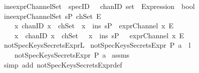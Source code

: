 \begin{isabellebody}
{}
\isanewline
%
\isanewline
%
\isanewline
{}\isamarkupfalse%
\isanewline
\ ine{\isacharunderscore}exprChannelSet\ {\isacharcolon}{\isacharcolon}\ {\isachardoublequoteopen}specID\ \ {\isasymRightarrow}\ chanID\ set\ {\isasymRightarrow}\ Expression\ {\isasymRightarrow}\ bool{\isachardoublequoteclose}\isanewline
{}\isanewline
\ {\isachardoublequoteopen}ine{\isacharunderscore}exprChannelSet\ sP\ chSet\ E\ {\isasymequiv}\ \isanewline
\ \ \ {\isacharparenleft}{\isacharparenleft}{\isasymforall}\ {\isacharparenleft}x\ {\isacharcolon}{\isacharcolon}chanID{\isacharparenright}{\isachardot}\ {\isacharparenleft}{\isacharparenleft}x\ {\isasymin}\ chSet{\isacharparenright}\ {\isasymlongrightarrow}\ {\isacharparenleft}{\isacharparenleft}x\ {\isasymin}\ {\isacharparenleft}ins\ sP{\isacharparenright}{\isacharparenright}\ {\isasymand}\ {\isacharparenleft}exprChannel\ x\ E{\isacharparenright}{\isacharparenright}{\isacharparenright}{\isacharparenright}\isanewline
\ \ \ {\isasymand}\isanewline
\ \ \ {\isacharparenleft}{\isasymforall}\ {\isacharparenleft}x\ {\isacharcolon}{\isacharcolon}\ chanID{\isacharparenright}{\isachardot}\ {\isacharparenleft}{\isacharparenleft}x\ {\isasymnotin}\ chSet{\isacharparenright}\ {\isasymand}\ {\isacharparenleft}\ x\ {\isasymin}\ {\isacharparenleft}ins\ sP{\isacharparenright}{\isacharparenright}\ {\isasymlongrightarrow}\ {\isasymnot}\ exprChannel\ x\ E{\isacharparenright}{\isacharparenright}{\isacharparenright}{\isachardoublequoteclose}\isanewline
\isanewline
%
\isanewline
%
\ \isanewline
%
\isanewline
{}\isamarkupfalse%
\ notSpecKeysSecretsExpr{\isacharunderscore}L{}{\isacharcolon}\isanewline
{}\ {\isachardoublequoteopen}notSpecKeysSecretsExpr\ P\ {\isacharparenleft}a\ {\isacharhash}\ l{\isacharparenright}{\isachardoublequoteclose}\isanewline
{}\ \ \ \ {\isachardoublequoteopen}notSpecKeysSecretsExpr\ P\ {\isacharbrackleft}a{\isacharbrackright}{\isachardoublequoteclose}\isanewline
%
\isadelimproof
%
\endisadelimproof
%
\isatagproof
{}\isamarkupfalse%
\ assms\ \isamarkupfalse%
\ {\isacharparenleft}simp\ add{\isacharcolon}\ notSpecKeysSecretsExpr{\isacharunderscore}def{\isacharparenright}\isanewline

\end{isabellebody}
